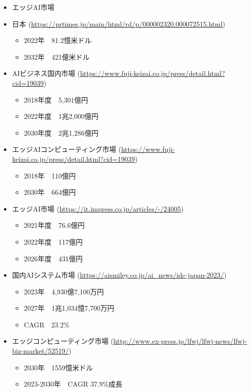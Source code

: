 \begin{itemize}
	\begin{itemize}
		\item エッジAI市場
			\item 日本 (\url{https://prtimes.jp/main/html/rd/p/000002320.000072515.html})
			\begin{itemize}
				\item 2022年　81.2憶米ドル
				\item 2032年　421億米ドル
			\end{itemize}
			\item AIビジネス国内市場 (\url{https://www.fuji-keizai.co.jp/press/detail.html?cid=19039})
			\begin{itemize}
				\item 2018年度　5,301億円
				\item 2022年度　1兆2,000億円
				\item 2030年度　2兆1,286億円
			\end{itemize}
			\item エッジAIコンピューティング市場 (\url{https://www.fuji-keizai.co.jp/press/detail.html?cid=19039})
			\begin{itemize}
				\item 2018年　110億円
				\item 2030年　664億円
			\end{itemize}
			\item エッジAI市場 (\url{https://it.impress.co.jp/articles/-/24005})
			\begin{itemize}
				\item 2021年度　76.6億円
				\item 2022年度　117億円
				\item 2026年度　431億円
			\end{itemize}
			\item 国内AIシステム市場 (\url{https://aismiley.co.jp/ai_news/idc-japan-2023/})
			\begin{itemize}
				\item 2023年　4,930億7,100万円
				\item 2027年　1兆1,034憶7,700万円
				\item CAGR　23.2\%
			\end{itemize}
		\item エッジコンピューティング市場 (\url{http://www.ex-press.jp/lfwj/lfwj-news/lfwj-biz-market/52519/})
		\begin{itemize}
			\item 2030年　1559憶米ドル
			\item 2023-2030年　CAGR 37.9\%成長
		\end{itemize}

\end{itemize}
\end{itemize}

